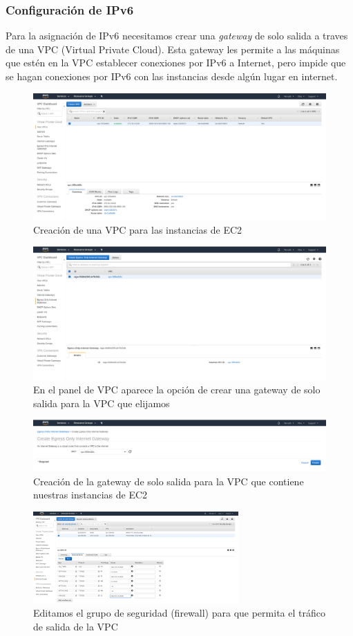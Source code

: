 \documentclass[9pt]{article}
\begin{document}
\subsubsection*{Configuración de IPv6}
Para la asignación de IPv6 necesitamos crear una \textit{gateway} de solo salida a traves de una \textsf{VPC} (Virtual Private Cloud). Esta gateway les permite a las máquinas que estén en la VPC establecer conexiones por IPv6 a Internet, pero impide que se hagan conexiones por IPv6 con las instancias desde algún lugar en internet.
\\
\begin{figure}[H]
  \centering
  \includegraphics[width=0.8\linewidth]{vpc}
  \caption{Creación de una VPC para las instancias de EC2}
\end{figure}
\begin{figure}
  \centering
  \includegraphics[width=0.8\linewidth]{vpc_egress_only}
  \caption{En el panel de VPC aparece la opción de crear una gateway de solo salida para la VPC que elijamos}
\end{figure}
\begin{figure}[H]
  \centering
  \includegraphics[width=0.8\linewidth]{egress_only_gateway}
  \caption{Creación de la gateway de solo salida para la VPC que contiene nuestras instancias de EC2}
\end{figure}
\begin{figure}[H]
  \centering
  \includegraphics[width=0.7\textwidth]{edit_security_group}
  \caption{Editamos el grupo de seguridad (firewall) para que permita el tráfico  de salida de la VPC}
\end{figure}
\end{document}
